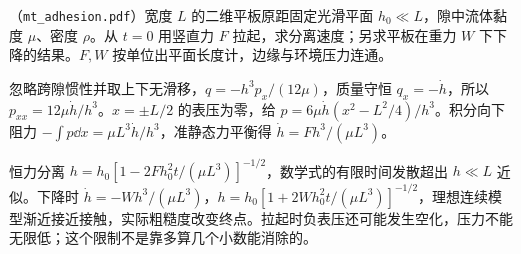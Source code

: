 \begin{exercise}
（\texttt{mt\_adhesion.pdf}）宽度 $L$ 的二维平板原距固定光滑平面 $h_0\ll L$，隙中流体黏度 $\mu$、密度 $\rho$。从 $t=0$ 用竖直力 $F$ 拉起，求分离速度；另求平板在重力 $W$ 下下降的结果。$F,W$ 按单位出平面长度计，边缘与环境压力连通。
\end{exercise}
\begin{solution}
忽略跨隙惯性并取上下无滑移，$q=-h^3p_x/(12\mu)$，质量守恒 $q_x=-\dot h$，所以 $p_{xx}=12\mu\dot h/h^3$。$x=\pm L/2$ 的表压为零，给 $p=6\mu\dot h(x^2-L^2/4)/h^3$。积分向下阻力 $-\int p\dd x=\mu L^3\dot h/h^3$，准静态力平衡得 $\dot h=Fh^3/(\mu L^3)$。

恒力分离 $h=h_0[1-2Fh_0^2t/(\mu L^3)]^{-1/2}$，数学式的有限时间发散超出 $h\ll L$ 近似。下降时 $\dot h=-Wh^3/(\mu L^3)$，$h=h_0[1+2Wh_0^2t/(\mu L^3)]^{-1/2}$，理想连续模型渐近接近接触，实际粗糙度改变终点。拉起时负表压还可能发生空化，压力不能无限低；这个限制不是靠多算几个小数能消除的。
\end{solution}
